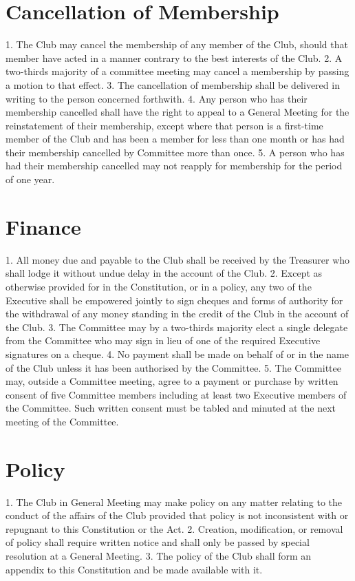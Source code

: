 \documentclass[12pt]{article} %
\begin{document}
\section{Cancellation of Membership}
1. The Club may cancel the membership of any member of the Club, should that
member have acted in a manner contrary to the best interests of the Club.
2. A two-thirds majority of a committee meeting may cancel a membership by passing a
motion to that effect.
3. The cancellation of membership shall be delivered in writing to the person concerned
forthwith.
4. Any person who has their membership cancelled shall have the right to appeal to a
General Meeting for the reinstatement of their membership, except where that person
is a first-time member of the Club and has been a member for less than one month or
has had their membership cancelled by Committee more than once.
5. A person who has had their membership cancelled may not reapply for membership
for the period of one year.

\section{Finance}
1. All money due and payable to the Club shall be received by the Treasurer who shall
lodge it without undue delay in the account of the Club.
2. Except as otherwise provided for in the Constitution, or in a policy, any two of the
Executive shall be empowered jointly to sign cheques and forms of authority for the
withdrawal of any money standing in the credit of the Club in the account of the
Club.
3. The Committee may by a two-thirds majority elect a single delegate from the
Committee who may sign in lieu of one of the required Executive signatures on a
cheque.
4. No payment shall be made on behalf of or in the name of the Club unless it has been
authorised by the Committee.
5. The Committee may, outside a Committee meeting, agree to a payment or purchase
by written consent of five Committee members including at least two Executive
members of the Committee. Such written consent must be tabled and minuted at the
next meeting of the Committee.

\section{Policy}
1. The Club in General Meeting may make policy on any matter relating to the conduct
of the affairs of the Club provided that policy is not inconsistent with or repugnant to
this Constitution or the Act.
2. Creation, modification, or removal of policy shall require written notice and shall
only be passed by special resolution at a General Meeting.
3. The policy of the Club shall form an appendix to this Constitution and be made
available with it.
\end{document}
